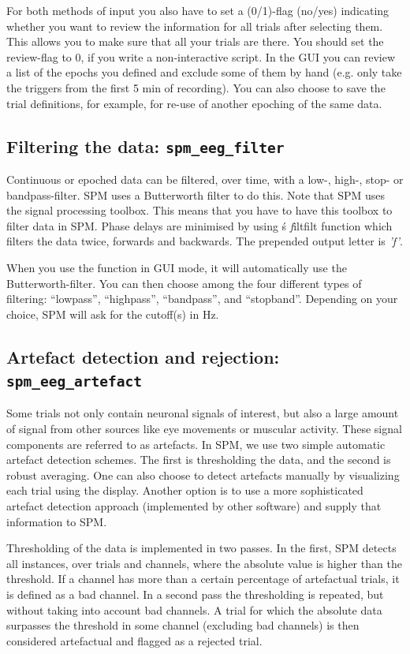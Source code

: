 For both methods of input you also have to set a (0/1)-flag (no/yes) indicating whether you want to review the information for all trials after selecting them. This allows you to make sure that all your trials are there. You should set the review-flag to 0, if you write a non-interactive script. In the GUI you can review a list of the epochs you defined and exclude some of them by hand (e.g. only take the triggers from the first 5 min of recording). You can also choose to save the trial definitions, for example, for re-use of another epoching of the same data.

\subsection{Filtering the data: \texttt{spm\_eeg\_filter}} 
Continuous or epoched data can be filtered, over time, with a low-, high-, stop- or bandpass-filter. SPM uses a Butterworth filter to do this. Note that SPM uses the signal processing toolbox. This means that you have to have this toolbox to filter data in SPM. Phase delays are minimised by using \matlab\'s {\textit filtfilt} function which filters the data twice, forwards and backwards. The prepended output letter is \textit{'f'}.

When you use the function in GUI mode, it will automatically
use the Butterworth-filter. You can then choose among the four different types of filtering: ``lowpass'', ``highpass'', ``bandpass'',
and ``stopband''. Depending on your choice, SPM will ask for the cutoff(s) in Hz.


\subsection{Artefact detection and rejection: \texttt{spm\_eeg\_artefact}}
Some trials not only contain neuronal signals of interest, but also a large amount of signal from other sources like eye movements or muscular activity. These signal components are referred to as artefacts. In SPM, we use two simple automatic artefact detection schemes. The first is thresholding the data, and the second is robust averaging. One can also choose to detect artefacts manually by visualizing each trial using the display. Another option is to use a more sophisticated artefact detection approach (implemented by other software) and supply that information to SPM.

Thresholding of the data is implemented in two passes. In the first, SPM detects all instances, over trials and channels, where the absolute value is higher than the threshold. If a channel has more than a certain percentage of artefactual trials, it is defined as a bad channel. In a second pass the thresholding is repeated, but without taking into account bad channels. A trial for which the absolute data surpasses the threshold in some channel (excluding bad channels) is then considered artefactual and flagged as a rejected trial.

